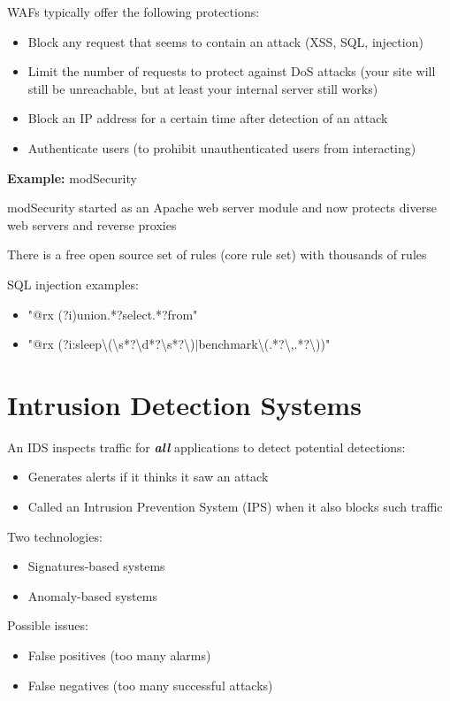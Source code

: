 \documentclass[11pt]{article}
\begin{document}
WAFs typically offer the following protections: 
\begin{itemize}
	\item Block any request that seems to contain an attack (XSS, SQL, injection)
	\item Limit the number of requests to protect against DoS attacks (your site will still be unreachable, but at least your internal server still works)
	\item Block an IP address for a certain time after detection of an attack
	\item Authenticate users (to prohibit unauthenticated users from interacting)

\end{itemize}

\textbf{Example:} modSecurity

modSecurity started as an Apache web server module and now protects diverse web servers and reverse proxies

There is a free open source set of rules (core rule set) with thousands of rules

SQL injection examples:
\begin{itemize}
	\item "@rx (?i)union.*?select.*?from"
	\item"@rx (?i:sleep\textbackslash(\textbackslash s*?\textbackslash d*?\textbackslash s*?\textbackslash)$\mid$benchmark\textbackslash(.*?\textbackslash ,.*?\textbackslash ))"
\end{itemize}
\section*{Intrusion Detection Systems}

An IDS inspects traffic for \textbf{\textit{all}} applications to detect potential detections:
\begin{itemize}
	\item Generates alerts if it thinks it saw an attack
	\item Called an Intrusion Prevention System (IPS) when it also blocks such traffic
\end{itemize}
Two technologies:
\begin{itemize}
	\item Signatures-based systems
	\item Anomaly-based systems
\end{itemize}

Possible issues:
\begin{itemize}
	\item False positives (too many alarms)
	\item False negatives (too many successful attacks)
\end{itemize}
\end{document}
